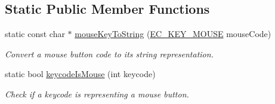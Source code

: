 \subsection*{Static Public Member Functions}
\begin{DoxyCompactItemize}
\item 
static const char $\ast$ \mbox{\hyperlink{classec_1_1_mouse_a8ea44f894f0467851d1a12747f8a5e4b}{mouse\+Key\+To\+String}} (\mbox{\hyperlink{classec_1_1_mouse_acabdd3509adc381e415c60b29554e2fb}{E\+C\+\_\+\+K\+E\+Y\+\_\+\+M\+O\+U\+SE}} mouse\+Code)
\begin{DoxyCompactList}\small\item\em Convert a mouse button code to its string representation. \end{DoxyCompactList}\item 
static bool \mbox{\hyperlink{classec_1_1_mouse_a6c43132b82c3d730515c3f6c8cf9e142}{keycode\+Is\+Mouse}} (int keycode)
\begin{DoxyCompactList}\small\item\em Check if a keycode is representing a mouse button. \end{DoxyCompactList}\end{DoxyCompactItemize}

